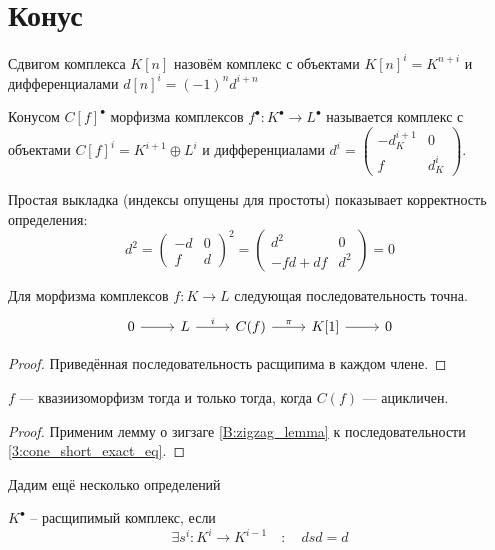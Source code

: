 \documentclass[../main.tex]{subfiles}
\begin{document}
\section{Конус}
\begin{to_def}
Сдвигом комплекса $K[n]$ назовём комплекс с объектами $K[n]^i = K^{n+i}$ и дифференциалами $d[n]^i = (-1)^nd^{i+n}$
\end{to_def}
\begin{to_def}
Конусом $C[f]^\bullet$ морфизма комплексов $f^\bullet:K^\bullet\to L^\bullet$ называется комплекс с объектами $C[f]^i = K^{i+1}\oplus L^i$ и дифференциалами $d^i = \begin{pmatrix}-d_K^{i+1}&0\\f&d_K^i\end{pmatrix}$.
\end{to_def}
Простая выкладка (индексы опущены для простоты) показывает корректность определения:
\begin{equation*}
d^2 = \begin{pmatrix}-d&0\\f&d\end{pmatrix}^2 = \begin{pmatrix}d^2&0\\-fd + df&d^2\end{pmatrix} = 0
\end{equation*}
\begin{to_suj}\label{3:cone_short_exact}
Для морфизма комплексов $f:K\to L$ следующая последовательность точна.
\begin{equation}\label{3:cone_short_exact_eq}
    \begin{tikzcd}
	0 & L & {C(f)} & {K[1]} & 0
	\arrow[from=1-1, to=1-2]
	\arrow["i", from=1-2, to=1-3]
	\arrow["\pi", from=1-3, to=1-4]
	\arrow[from=1-4, to=1-5]
\end{tikzcd}
\end{equation}
\end{to_suj}
\begin{proof}
Приведённая последовательность расщипима в каждом члене.
\end{proof}
\begin{to_thr}
$f$ --- квазиизоморфизм тогда и только тогда, когда $C(f)$ --- ацикличен.
\end{to_thr}
\begin{proof}
    Применим лемму о зигзаге \ref{B:zigzag_lemma} к последовательности \eqref{3:cone_short_exact_eq}.
\end{proof}
Дадим ещё несколько определений 
\begin{to_def}
$K^\bullet$ -- расщипимый комплекс, если 
\[\exists s^i\colon K^{i} \to K^{i-1} \quad \colon \quad dsd = d \]
\end{to_def}
\end{document}
